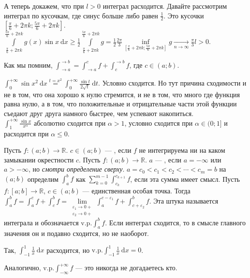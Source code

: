 \documentclass{article}
\begin{document}
\begin{itemize}
\begin{Example}
            А теперь докажем, что при $l>0$ интеграл расходится. Давайте рассмотрим интеграл по кусочкам, где синус больше либо равен $\frac12$. Это кусочки $\left[\frac\pi6+2\pi k;\frac{5\pi}6+2\pi k\right]$. $\int\limits_{\frac\pi6+2\pi k}^{\frac{5\pi}6+2\pi k}g(x)\sin x~\mathrm dx\geqslant\frac12\int\limits_{\frac\pi6+2\pi k}^{\frac{5\pi}6+2\pi k}g=\frac12\frac{2\pi}3\inf\limits_{\left[\frac\pi6+2\pi k;\frac{5\pi}6+2\pi k\right]}g\underset{n\to\infty}\longrightarrow\frac\pi3l>0$.
        \end{Example}
        \begin{Comment}
            Как мы помним, $\int_{\to a}^{\to b}=\int_{\to a}^cf+\int_c^{\to b}f$, где $c\in(a;b)$.
        \end{Comment}
        \begin{Example}
            $\int_0^{+\infty}\sin x^2~\mathrm dx\overset{t=x^2}=\int_0^{+\infty}\frac{\sin t}{2\sqrt t}~\mathrm dt$. Условно сходится. Но тут причина сходимости и не в том, что она хорошо к нулю стремится, и не в том, что много где функция равна нулю, а в том, что положительные и отрицательные части этой функции съедают друг друга намного быстрее, чем успевают накопиться.\\
            $\int_1^{+\infty}\frac{\sin x}{x^\alpha}$ абсолютно сходится при $\alpha>1$, условно сходится при $\alpha\in(0;1]$ и расходится при $\alpha\leqslant0$.
        \end{Example}
        \dfn Пусть $f\colon(a;b)\to\mathbb R$. $c\in(a;b)$ --- , если $f$ не интегрируема ни на каком замыкании окрестности $c$.
        \dfn Пусть $f\colon(a;b)\to\mathbb R$. $a$ --- , если $a=-\infty$ или $a>-\infty$, но \textit{смотри определение сверху}.
        \dfn {} $a=c_0<c_1<c_2<\cdots<c_m=b$ на $(a;b)$ определим $\int_a^bf$ как $\sum\limits_{k=0}^{m-1}\int_{c_k}^{c_{k+1}}f$, если эта сумма имеет смысл.
        \dfn Пусть $f\colon[a;b]\to\mathbb R$, $c\in(a;b)$ --- единственная особая точка. Тогда $\int_a^bf=\int_a^cf+\int_c^bf=\lim\limits_{\substack{\varepsilon_1\to0+\\\varepsilon_2\to0+}}\int_a^{c-\varepsilon_1}f+\int_{c+\varepsilon_2}^bf$. Эта штука называется  интеграла и обозначается $\mathrm{v.p.}\int_a^bf$.
        \thm Если интеграл сходится, то в смысле главного значения он и подавно сходится, но не наоборот.
        \begin{Proof}
            Так, $\int_{-1}^1\frac1x~\mathrm dx$ расходится, но $\mathrm{v.p.}\int_{-1}^1\frac1x~\mathrm dx=0$.
        \end{Proof}
        \dfn Аналогично, $\mathrm{v.p.}\int_{-\infty}^{+\infty}f$ --- это никогда не догадаетесь кто.
    \end{itemize}
\end{document}
